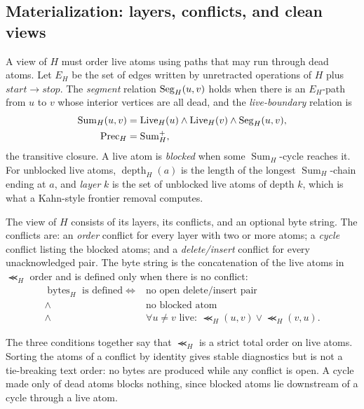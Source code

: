 \subsection{Materialization: layers, conflicts, and clean views}\label{sec:views}
A view of $H$ must order live atoms using paths that may run through dead atoms. Let $E_H$ be the set of edges written by unretracted operations of $H$ plus $\mathit{start}\to\mathit{stop}$. The \emph{segment} relation $\operatorname{Seg}_H(u,v)$ holds when there is an $E_H$-path from $u$ to $v$ whose interior vertices are all dead, and the \emph{live-boundary} relation is
\begin{equation}
 \begin{aligned}
 \operatorname{Sum}_H(u,v)&=\operatorname{Live}_H(u)\land\operatorname{Live}_H(v)\land\operatorname{Seg}_H(u,v),\\
 \operatorname{Prec}_H&=\operatorname{Sum}_H^{+},
 \end{aligned}
 \label{eq:prec}
\end{equation}
the transitive closure. A live atom is \emph{blocked} when some $\operatorname{Sum}_H$-cycle reaches it. For unblocked live atoms, $\operatorname{depth}_H(a)$ is the length of the longest $\operatorname{Sum}_H$-chain ending at $a$, and \emph{layer} $k$ is the set of unblocked live atoms of depth $k$, which is what a Kahn-style frontier removal computes.

\begin{definition}[View]\label{def:view}
The view of $H$ consists of its layers, its conflicts, and an optional byte string. The conflicts are: an \emph{order} conflict for every layer with two or more atoms; a \emph{cycle} conflict listing the blocked atoms; and a \emph{delete/insert} conflict for every unacknowledged pair. The byte string is the concatenation of the live atoms in $\Prec_H$ order and is defined only when there is no conflict:
\begin{equation}
 \begin{aligned}
 \operatorname{bytes}_H\text{ is defined}\iff{}&\text{no open delete/insert pair}\\
 \land\;&\text{no blocked atom}\\
 \land\;&\forall u\ne v\text{ live}:\ \Prec_H(u,v)\lor\Prec_H(v,u).
 \end{aligned}
 \label{eq:clean}
\end{equation}
\end{definition}
The three conditions together say that $\Prec_H$ is a strict total order on live atoms. Sorting the atoms of a conflict by identity gives stable diagnostics but is not a tie-breaking text order: no bytes are produced while any conflict is open. A cycle made only of dead atoms blocks nothing, since blocked atoms lie downstream of a cycle through a live atom.

